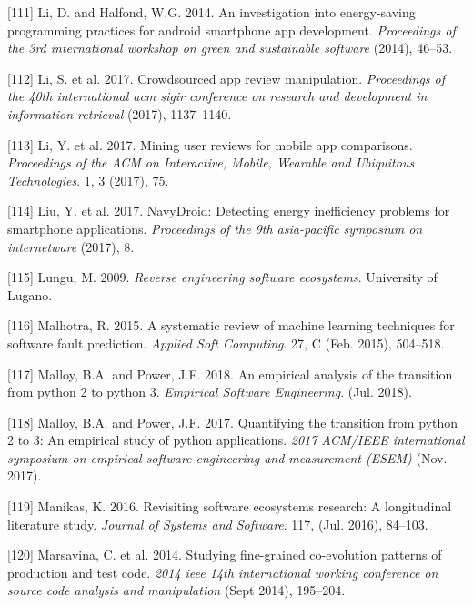 \documentclass[]{book}
\begin{document}
\hypertarget{ref-LH2014}{}
{[}111{]} Li, D. and Halfond, W.G. 2014. An investigation into
energy-saving programming practices for android smartphone app
development. \emph{Proceedings of the 3rd international workshop on
green and sustainable software} (2014), 46--53.

\hypertarget{ref-i2017crowdsourced}{}
{[}112{]} Li, S. et al. 2017. Crowdsourced app review manipulation.
\emph{Proceedings of the 40th international acm sigir conference on
research and development in information retrieval} (2017), 1137--1140.

\hypertarget{ref-li2017mining}{}
{[}113{]} Li, Y. et al. 2017. Mining user reviews for mobile app
comparisons. \emph{Proceedings of the ACM on Interactive, Mobile,
Wearable and Ubiquitous Technologies}. 1, 3 (2017), 75.

\hypertarget{ref-LWXM2017}{}
{[}114{]} Liu, Y. et al. 2017. NavyDroid: Detecting energy inefficiency
problems for smartphone applications. \emph{Proceedings of the 9th
asia-pacific symposium on internetware} (2017), 8.

\hypertarget{ref-Lungu2009}{}
{[}115{]} Lungu, M. 2009. \emph{Reverse engineering software
ecosystems}. University of Lugano.

\hypertarget{ref-Malhotra2015}{}
{[}116{]} Malhotra, R. 2015. A systematic review of machine learning
techniques for software fault prediction. \emph{Applied Soft Computing}.
27, C (Feb. 2015), 504--518.

\hypertarget{ref-Malloy2018}{}
{[}117{]} Malloy, B.A. and Power, J.F. 2018. An empirical analysis of
the transition from python 2 to python 3. \emph{Empirical Software
Engineering}. (Jul. 2018).

\hypertarget{ref-Malloy2017}{}
{[}118{]} Malloy, B.A. and Power, J.F. 2017. Quantifying the transition
from python 2 to 3: An empirical study of python applications.
\emph{2017 ACM/IEEE international symposium on empirical software
engineering and measurement (ESEM)} (Nov. 2017).

\hypertarget{ref-Manikas2016}{}
{[}119{]} Manikas, K. 2016. Revisiting software ecosystems research: A
longitudinal literature study. \emph{Journal of Systems and Software}.
117, (Jul. 2016), 84--103.

\hypertarget{ref-marsavina2014}{}
{[}120{]} Marsavina, C. et al. 2014. Studying fine-grained co-evolution
patterns of production and test code. \emph{2014 ieee 14th international
working conference on source code analysis and manipulation} (Sept
2014), 195--204.
\end{document}
